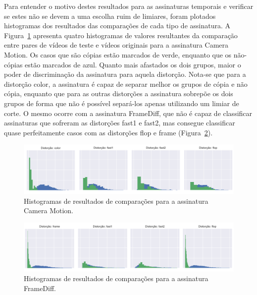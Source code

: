 Para entender o motivo destes resultados para as assinaturas temporais e verificar se estes não se devem a uma escolha ruim de limiares, foram plotados histogramas dos resultados das comparações de cada tipo de assinatura. A Figura~\ref{fig:histograma-camera-motion} apresenta quatro histogramas de valores resultantes da comparação entre pares de vídeos de teste e vídeos originais para a assinatura Camera Motion. Os casos que são cópias estão marcados de verde, enquanto que os não-cópias estão marcados de azul. Quanto mais afastados os dois grupos, maior o poder de discriminação da assinatura para aquela distorção. Nota-se que para a distorção color, a assinatura é capaz de separar melhor os grupos de cópia e não cópia, enquanto que para as outras distorções a assinatura sobrepõe os dois grupos de forma que não é possível separá-los apenas utilizando um limiar de corte. O mesmo ocorre com a assinatura FrameDiff, que não é capaz de classificar assinaturas que sofreram as distorções fast1 e fast2, mas consegue classificar quase perfeitamente casos com as distorções flop e frame (Figura~\ref{fig:histograma-framediff}).

\begin{figure}[h]
	\centering
	\caption{Histogramas de resultados de comparações para a assinatura Camera Motion.}
	\label{fig:histograma-camera-motion}
	\includegraphics[width=\textwidth]{dados/figuras/experimentos/histograma_distorcao_Camera_Motion_cortado.png}
\end{figure}

\begin{figure}[h]
	\centering
	\caption{Histogramas de resultados de comparações para a assinatura FrameDiff.}
	\label{fig:histograma-framediff}
	\includegraphics[width=\textwidth]{dados/figuras/experimentos/histograma_distorcao_FrameDiff_cortado.png}
\end{figure}

